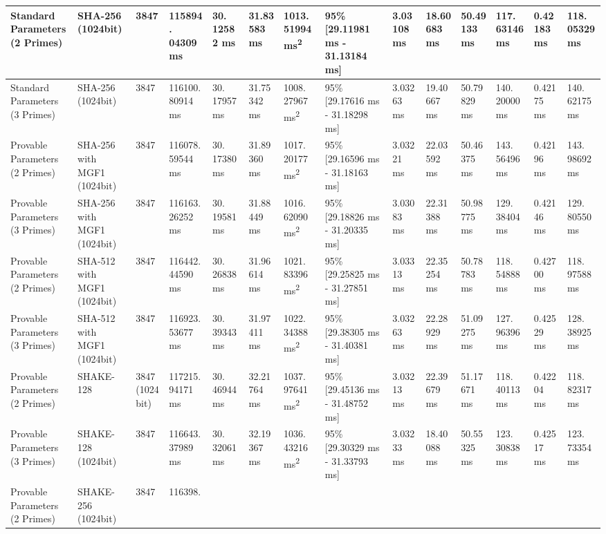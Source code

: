 \documentclass[]{final_report}
\theoremstyle{definition}
\begin{document}
\begin{landscape}
\begin{longtable}{|p{2.3cm}|p{1.8cm}|p{1.0cm}|p{1.7cm}|p{1.2cm}|p{1.5cm}|p{1.8cm}|p{1.5cm}|p{1.2cm}|p{1.5cm}|p{1.3cm}|p{1.2cm}|p{1.3cm}|p{1.3cm}|}
Standard Parameters (2 Primes) & SHA-256 (1024bit) & 3847 & 115894.
04309 ms & 30.
12582 ms & 31.83583 ms & 1013.
51994 ms\textsuperscript{2} & 95\% [29.11981 ms - 31.13184 ms] & 3.03108 ms & 18.60683 ms & 50.49133 ms & 117.
63146 ms & 0.42183 ms & 118.
05329 ms \\
\hline
Standard Parameters (3 Primes) & SHA-256 (1024bit) & 3847 & 116100.
80914 ms & 30.
17957 ms & 31.75342 ms & 1008.
27967 ms\textsuperscript{2} & 95\% [29.17616 ms - 31.18298 ms] & 3.03263 ms & 19.40667 ms & 50.79829 ms & 140.
20000 ms & 0.42175 ms & 140.
62175 ms \\
\hline
Provable Parameters (2 Primes) & SHA-256 with MGF1 (1024bit) & 3847 & 116078.
59544 ms & 30.
17380 ms & 31.89360 ms & 1017.
20177 ms\textsuperscript{2} & 95\% [29.16596 ms - 31.18163 ms] & 3.03221 ms & 22.03592 ms & 50.46375 ms & 143.
56496 ms & 0.42196 ms & 143.
98692 ms \\
\hline
Provable Parameters (3 Primes) & SHA-256 with MGF1 (1024bit) & 3847 & 116163.
26252 ms & 30.
19581 ms & 31.88449 ms & 1016.
62090 ms\textsuperscript{2} & 95\% [29.18826 ms - 31.20335 ms] & 3.03083 ms & 22.31388 ms & 50.98775 ms & 129.
38404 ms & 0.42146 ms & 129.
80550 ms \\
\hline
Provable Parameters (2 Primes) & SHA-512 with MGF1 (1024bit) & 3847 & 116442.
44590 ms & 30.
26838 ms & 31.96614 ms & 1021.
83396 ms\textsuperscript{2} & 95\% [29.25825 ms - 31.27851 ms] & 3.03313 ms & 22.35254 ms & 50.78783 ms & 118.
54888 ms & 0.42700 ms & 118.
97588 ms \\
\hline
Provable Parameters (3 Primes) & SHA-512 with MGF1 (1024bit) & 3847 & 116923.
53677 ms & 30.
39343 ms & 31.97411 ms & 1022.
34388 ms\textsuperscript{2} & 95\% [29.38305 ms - 31.40381 ms] & 3.03263 ms & 22.28929 ms & 51.09275 ms & 127.
96396 ms & 0.42529 ms & 128.
38925 ms \\
\hline
Provable Parameters (2 Primes) & SHAKE-128 & 3847 (1024bit) & 117215.
94171 ms & 30.
46944 ms & 32.21764 ms & 1037.
97641 ms\textsuperscript{2} & 95\% [29.45136 ms - 31.48752 ms] & 3.03213 ms & 22.39679 ms & 51.17671 ms & 118.
40113 ms & 0.42204 ms & 118.
82317 ms \\
\hline
Provable Parameters (3 Primes) & SHAKE-128 (1024bit) & 3847 & 116643.
37989 ms & 30.
32061 ms & 32.19367 ms & 1036.
43216 ms\textsuperscript{2} & 95\% [29.30329 ms - 31.33793 ms] & 3.03233 ms & 18.40088 ms & 50.55325 ms & 123.
30838 ms & 0.42517 ms & 123.
73354 ms \\
\hline
Provable Parameters (2 Primes) & SHAKE-256 (1024bit) & 3847 & 116398.

\end{longtable}
\end{landscape}
\end{document}
